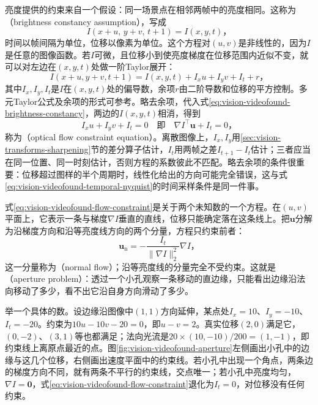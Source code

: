 亮度提供的约束来自一个假设：同一场景点在相邻两帧中的亮度相同。这称为（brightness constancy assumption），写成
\begin{equation}
  I(x+u,\,y+v,\,t+1)=I(x,y,t)\text{，}
  \label{eq:vision-videofound-brightness-constancy}
\end{equation}
时间以帧间隔为单位，位移以像素为单位。这个方程对$(u,v)$是非线性的，因为$I$是任意的图像函数。若$I$可微，且位移小到使亮度梯度在位移范围内近似不变，就可以对左边在$(x,y,t)$处做一阶Taylor展开：
\[
  I(x+u,y+v,t+1)=I(x,y,t)+I_x u+I_y v+I_t+r\text{，}
\]
其中$I_x,I_y,I_t$是$I$在$(x,y,t)$处的偏导数，余项$r$由二阶导数和位移的平方控制。多元Taylor公式及余项的形式可参考。略去余项，代入式\eqref{eq:vision-videofound-brightness-constancy}，两边的$I(x,y,t)$相消，得到
\begin{equation}
  I_x u+I_y v+I_t=0
  \quad\text{即}\quad
  \nabla I^\top\bm u+I_t=0\text{，}
  \label{eq:vision-videofound-flow-constraint}
\end{equation}
称为（optical flow constraint equation）。离散图像上，$I_x,I_y$用\ref{sec:vision-transforms-sharpening}节的差分算子估计，$I_t$用两帧之差$I_{t+1}-I_t$估计；三者应当在同一位置、同一时刻估计，否则方程的系数彼此不匹配。略去余项的条件很重要：位移超过图样的半个周期时，线性化给出的方向可能完全错误，这与式\eqref{eq:vision-videofound-temporal-nyquist}的时间采样条件是同一件事。

式\eqref{eq:vision-videofound-flow-constraint}是关于两个未知数的一个方程。在$(u,v)$平面上，它表示一条与梯度$\nabla I$垂直的直线，位移只能确定落在这条线上。把$\bm u$分解为沿梯度方向和沿等亮度线方向的两个分量，方程只约束前者：
\[
  \bm u_{\mathrm n}=-\frac{I_t}{\lVert\nabla I\rVert_2^2}\nabla I\text{，}
\]
这一分量称为（normal flow）；沿等亮度线的分量完全不受约束。这就是（aperture problem）：透过一个小孔观察一条移动的直边缘，只能看出边缘沿法向移动了多少，看不出它沿自身方向滑动了多少。

举一个具体的数。设边缘沿图像中$(1,1)$方向延伸，某点处$I_x=10$、$I_y=-10$、$I_t=-20$。约束为$10u-10v-20=0$，即$u-v=2$。真实位移$(2,0)$满足它，$(0,-2)$、$(3,1)$等也都满足；法向光流是$20\times(10,-10)/200=(1,-1)$，即约束线上离原点最近的点。图\ref{fig:vision-videofound-aperture}左侧画出小孔中的边缘与这几个位移，右侧画出速度平面中的约束线。若小孔中出现一个角点，两条边的梯度方向不同，就有两条不平行的约束线，交点唯一；若小孔中亮度均匀，$\nabla I=\bm 0$，式\eqref{eq:vision-videofound-flow-constraint}退化为$I_t=0$，对位移没有任何约束。

